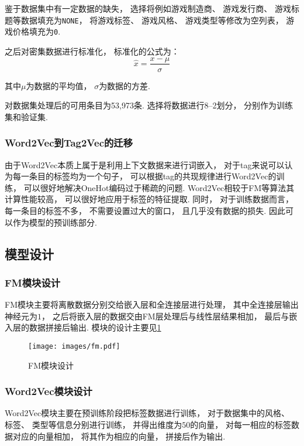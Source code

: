 鉴于数据集中有一定数据的缺失，
选择将例如游戏制造商、
游戏发行商、
游戏标题等数据填充为\verb|NONE|，
将游戏标签、
游戏风格、
游戏类型等修改为空列表，
游戏价格填充为\verb|0|.

之后对密集数据进行标准化，
标准化的公式为：
\begin{equation}
	\hat{x} = \frac{x-\mu}{\sigma}
\end{equation}

其中$\mu$为数据的平均值，
$\sigma$为数据的方差.

对数据集处理后的可用条目为53,973条.
选择将数据进行8--2划分，
分别作为训练集和验证集.

\subsubsection{Word2Vec到Tag2Vec的迁移}

由于Word2Vec本质上属于是利用上下文数据来进行词嵌入，
对于tag来说可以认为每一条目的标签均为一个句子，
可以根据tag的共现规律进行Word2Vec的训练，
可以很好地解决OneHot编码过于稀疏的问题.
Word2Vec相较于FM等算法其计算性能较高，
可以很好地应用于标签的特征提取.
同时，
对于训练数据而言，
每一条目的标签不多，
不需要设置过大的窗口，
且几乎没有数据的损失.
因此可以作为模型的预训练部分.

\subsection{模型设计\label{sec:design}}

\subsubsection{FM模块设计}

FM模块主要将离散数据分别交给嵌入层和全连接层进行处理，
其中全连接层输出神经元为$1$，
之后将嵌入层的数据交由FM层处理后与线性层结果相加，
最后与嵌入层的数据拼接后输出.
模块的设计主要见\cref{fig:fm}

\begin{figure}[!htbp]
	\centering
	\texttt{[image: images/fm.pdf]}
	\caption{FM模块设计}\label{fig:fm}
\end{figure}

\subsubsection{Word2Vec模块设计}

Word2Vec模块主要在预训练阶段把标签数据进行训练，
对于数据集中的风格、
标签、
类型等信息分别进行训练，
并得出维度为$50$的向量，
对每一相应的标签数据对应的向量相加，
将其作为相应的向量，
拼接后作为输出.

